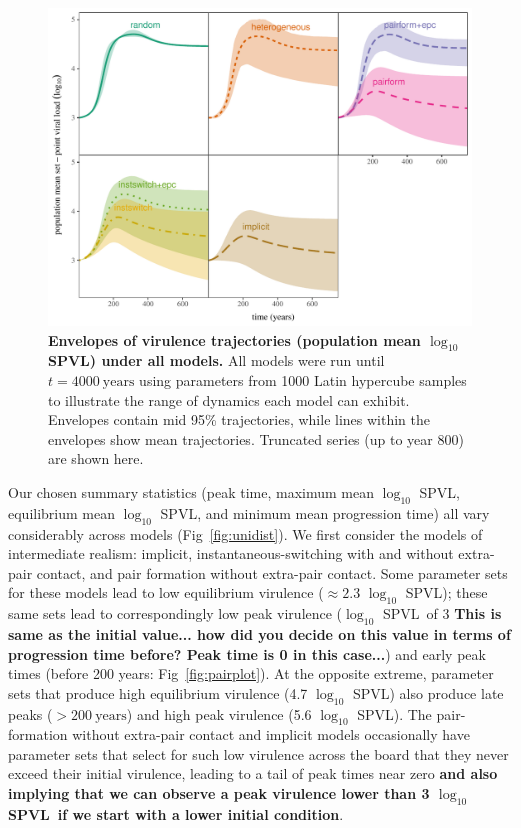 \documentclass[10pt,letterpaper]{article}
\renewcommand{\figurename}{Fig}
\newcommand{\Lspvl}{$\log_{10}$ SPVL}
\newcommand{\todo}[1]{\color{red} \textbf{#1}}
\begin{document}
\begin{figure}[!ht]
\includegraphics[width=\textwidth]{../figures/fig2.pdf}
\caption{{\bf Envelopes of virulence trajectories (population mean \Lspvl) under all models.}
All models were run until $t=4000~\textrm{years}$ using parameters from 1000 Latin hypercube samples to illustrate the range of dynamics each model can exhibit. Envelopes contain mid 95\% trajectories, while lines within the envelopes show mean trajectories. Truncated series (up to year 800) are shown here.}
\label{fig:virtraj}
\end{figure}

Our chosen summary statistics (peak time, maximum mean \Lspvl, equilibrium mean \Lspvl, and minimum mean progression time) all vary considerably across models
(\figurename~\ref{fig:unidist}).
We first consider the models of intermediate realism: implicit,
instantaneous-switching with and without extra-pair contact, and
pair formation without extra-pair contact. Some parameter
sets for these models lead to low equilibrium virulence ($\approx 2.3$ \Lspvl);
these same sets lead to correspondingly low
peak virulence (\Lspvl\ of 3 \todo{This is same as the initial value... how did you decide on this value in terms of progression time before? Peak time is 0 in this case...}) and early peak times (before 200 years: \figurename~\ref{fig:pairplot}).
At the opposite extreme, parameter sets that produce high equilibrium virulence (4.7 \Lspvl)
also produce late peaks ($> 200~\text{years}$) and
high peak virulence (5.6 \Lspvl).
The pair-formation without extra-pair contact and implicit models
occasionally have parameter sets that select for such low virulence across
the board that they never exceed their initial virulence, leading to a tail
of peak times near zero \todo{and also implying that we can observe a peak virulence lower than 3 \Lspvl\ if we start with a lower initial condition}.
\end{document}
